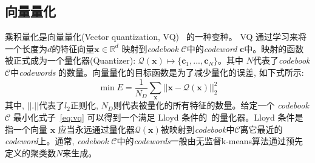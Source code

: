 \subsection{向量量化}
乘积量化是向量量化(Vector quantization, VQ)~\cite{gray1984vector} 的一种变种。 VQ 通过学习来将一个长度为$d$的特征向量$\mathbf{x} \in \mathbb{R}^d$ 映射到\textit{codebook} $\mathcal{C}$中的\textit{codeword} $\textbf{c}$中。映射的函数被正式成为一个量化器(Quantizer):  $\mathcal{Q}(\mathbf{x}) \mapsto \{\mathbf{c}_1,...,\mathbf{c}_N\}$。其中 $N$代表了\textit{codebook} $\mathcal{C}$中\textit{codewords} 的数量。向量量化的目标函数是为了减少量化的误差, 如下式所示:
\begin{equation}
    \label{eq:vq}
      \min E = \frac{1}{N_{D}} \sum_{\mathbf{x}} ||\mathbf{x} - \mathcal{Q}(\mathbf{x}) ||^2_2
  \end{equation}
其中,  $||.||$代表了$l_2$正则化,  $N_{D}$则代表被量化的所有特征的数量。给定一个 \textit{codebook} $\mathcal{C}$ 最小化式子~\ref{eq:vq} 可以得到一个满足 Lloyd 条件的~\cite{gray1984vector}的量化器。Lloyd 条件是指一个向量 $\mathbf{x}$ 应当永远通过量化器$\mathcal{Q}(\mathbf{x})$被映射到\textit{codebook}中$\mathcal{C}$离它最近的\textit{codeword}上。通常, \textit{codebook} $\mathcal{C}$中的\textit{codewords}一般由无监督k-means算法通过预先定义的聚类数$N$来生成。

